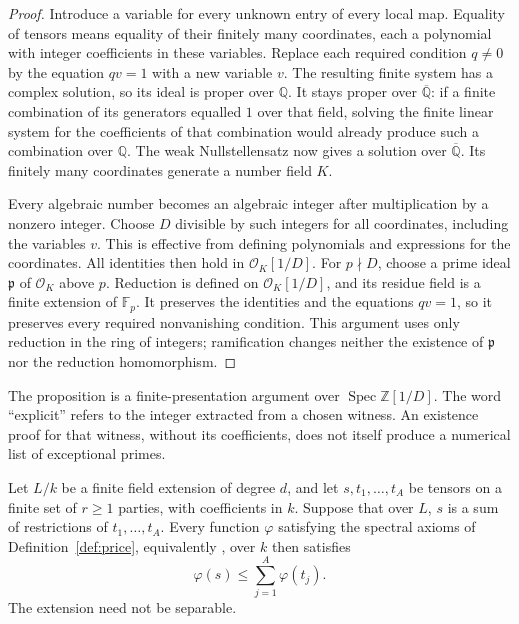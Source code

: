 \begin{proof}
Introduce a variable for every unknown entry of every local map.
Equality of tensors means equality of their finitely many
coordinates, each a polynomial with integer coefficients in these
variables.  Replace each required condition $q\ne0$ by the equation
$qv=1$ with a new variable $v$.  The resulting finite system has
a complex solution, so its ideal is proper over $\mathbb Q$.
It stays proper over $\overline{\mathbb Q}$: if a finite
combination of its generators equalled $1$ over that field,
solving the finite linear system for the coefficients of that
combination would already produce such a combination over
$\mathbb Q$.  The weak Nullstellensatz now gives a solution
over $\overline{\mathbb Q}$.  Its finitely many coordinates
generate a number field $K$.

Every algebraic number becomes an algebraic integer after
multiplication by a nonzero integer.  Choose $D$ divisible by
such integers for all coordinates, including the variables $v$.
This is effective from defining polynomials and expressions for
the coordinates.  All identities then hold in
$\mathcal O_K[1/D]$.  For $p\nmid D$, choose a prime ideal
$\mathfrak p$ of $\mathcal O_K$ above $p$.  Reduction is defined
on $\mathcal O_K[1/D]$, and its residue field is a finite
extension of $\mathbb F_p$.  It preserves the identities and
the equations $qv=1$, so it preserves every required
nonvanishing condition.  This argument uses only reduction
in the ring of integers; ramification changes neither the
existence of $\mathfrak p$ nor the reduction homomorphism.
\end{proof}

The proposition is a finite-presentation argument over
$\operatorname{Spec}\mathbb Z[1/D]$.  The word ``explicit''
refers to the integer extracted from a chosen witness.  An
existence proof for that witness, without its coefficients,
does not itself produce a numerical list of exceptional primes.

\begin{lemma}
\label{lem:spectral-field-descent}
Let $L/k$ be a finite field extension of degree $d$, and let
$s,t_1,\ldots,t_A$ be tensors on a finite set of $r\geq1$
parties, with coefficients in $k$.  Suppose that over $L$,
$s$ is a sum of restrictions of $t_1,\ldots,t_A$.
Every function $\varphi$ satisfying the spectral axioms of
Definition~\ref{def:price}, equivalently \cite[Definition A.1]{Anthropic2026}, over $k$ then satisfies
\[
 \varphi(s)\leq\sum_{j=1}^A\varphi(t_j).
\]
The extension need not be separable.
\end{lemma}

